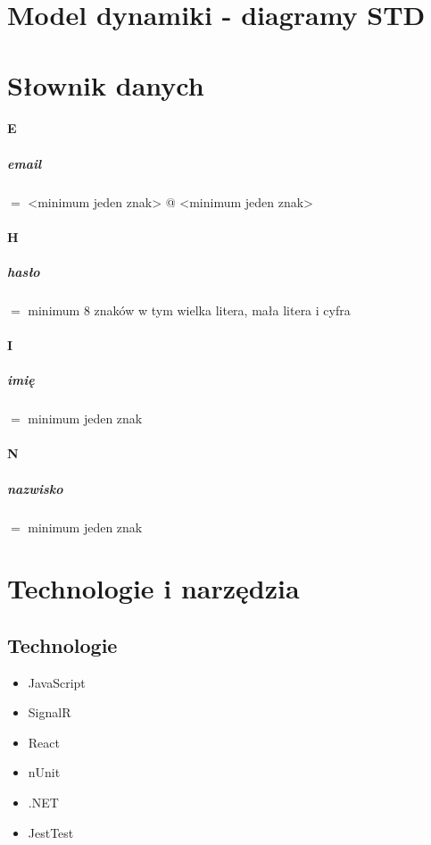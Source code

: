 \documentclass[12pt]{report}
\begin{document}
	
	\chapter{Model dynamiki - diagramy STD}
	
	\chapter{Słownik danych}
	
	\subsubsection{E}
\paragraph{email} $=$ <minimum jeden znak> @ <minimum jeden znak> 
\subsubsection{H}
\paragraph{hasło} $=$ minimum 8 znaków w tym wielka litera, mała litera i cyfra 
\subsubsection{I}
\paragraph{imię}  $=$ minimum jeden znak  
\subsubsection{N}
\paragraph{nazwisko} $=$ minimum jeden znak 


	\chapter{Technologie i narzędzia}	
		\section{Technologie}
		\begin{itemize}
			\item JavaScript
			\item SignalR
			\item React
			\item nUnit
			\item .NET
			\item JestTest
		\end{itemize}
		
\end{document}
